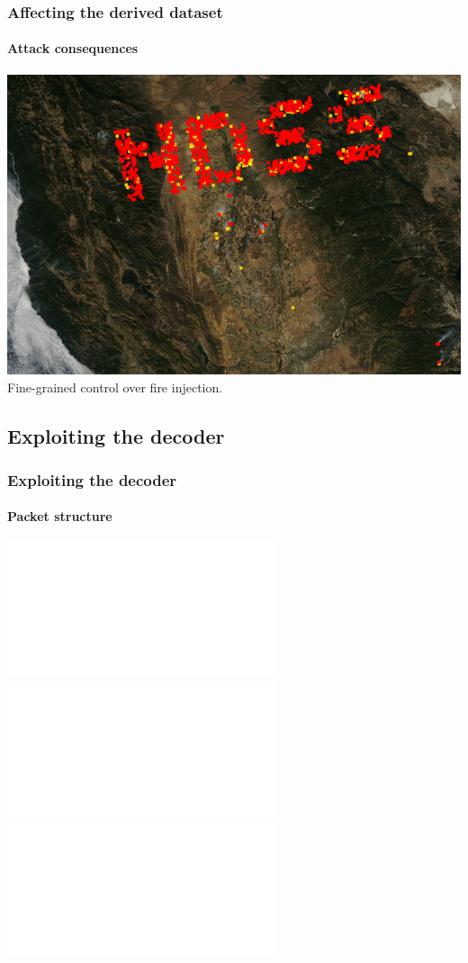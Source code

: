 \documentclass{beamer}
\begin{document}
\begin{frame}
  \frametitle{Affecting the derived dataset}
  \framesubtitle{Attack consequences}
  \includegraphics[width=\textwidth]{images/injection/pixels_800_140.jpg}
  \newline
  \centering
  Fine-grained control over fire injection.
\end{frame}

\subsection{Exploiting the decoder}

\begin{frame}
  \frametitle{Exploiting the decoder}
  \framesubtitle{Packet structure}
  \includegraphics<1|handout:0>[width=\textwidth]{images/packet_data_1.pdf}%
  \includegraphics<2|handout:0>[width=\textwidth]{images/packet_data_2.pdf}%
  \includegraphics<3->[width=\textwidth]{images/packet_data_3.pdf}%
\end{frame}
\end{document}
